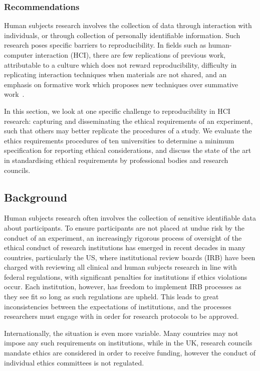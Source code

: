 \subsubsection{Recommendations}




Human subjects research involves the collection of data through interaction
with individuals, or through collection of personally identifiable
information. Such research poses specific barriers to reproducibility. In
fields such as human-computer interaction (HCI), there are few replications of
previous work, attributable to a culture which does not reward
reproducibility, difficulty in replicating interaction techniques when
materials are not shared, and an emphasis on formative work which proposes new
techniques over summative work~\cite{hornbaek:replications}.

In this section, we look at one specific challenge to reproducibility in HCI
research: capturing and disseminating the ethical requirements of an
experiment, such that others may better replicate the procedures of a
study. We evaluate the ethics requirements procedures of ten universities to
determine a minimum specification for reporting ethical considerations, and
discuss the state of the art in standardising ethical requirements by
professional bodies and research councils.

\subsection{Background}
Human subjects research often involves the collection
of sensitive identifiable data about participants. To ensure participants are
not placed at undue risk by the conduct of an experiment, an increasingly
rigorous process of oversight of the ethical conduct of research institutions
has emerged in recent decades in many countries, particularly the US, where
institutional review boards (IRB) have been charged with reviewing all
clinical and human subjects research in line with federal regulations, with
significant penalties for institutions if ethics violations occur. Each
institution, however, has freedom to implement IRB processes as they see fit
so long as such regulations are upheld. This leads to great inconsistencies
between the expectations of institutions, and the processes researchers must
engage with in order for research protocols to be approved.

Internationally, the situation is even more variable. Many countries may not
impose any such requirements on institutions, while in the UK, research
councils mandate ethics are considered in order to receive funding, however
the conduct of individual ethics committees is not regulated.

